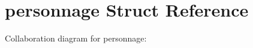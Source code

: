 \hypertarget{structpersonnage}{}\section{personnage Struct Reference}
\label{structpersonnage}


Collaboration diagram for personnage\+:

